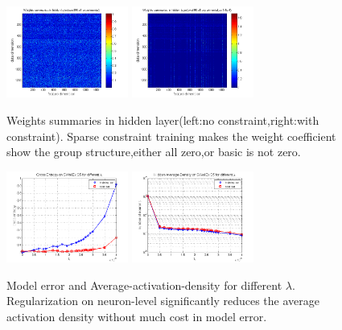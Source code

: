\begin{figure}
\includegraphics[width=4cm,height=3cm]{figure/Weights_summaries_in_hidden_laye_swell_exp}
\includegraphics[width=4cm,height=3cm]{figure/Weights_summaries_in_hidden_laye_swell_exp_sc_3dot5_e_neg_5}
\caption{Weights summaries in hidden layer(left:no constraint,right:with constraint). Sparse constraint
training makes the weight coefficient show the group structure,either all zero,or basic is not zero.}
\end{figure}

\begin{figure}
\includegraphics[width=4cm,height=3cm]{figure/Cross_Entropy_on_SWellEx_S5_for_different_lambda}
\includegraphics[width=4cm,height=3cm]{figure/Hidden_Average_Density_on_SWellEx_S5_for_different_lambda}
\caption{Model error and Average-activation-density for different $\lambda $.  Regularization on neuron-level
significantly reduces the average activation density without much cost in model error.}
\end{figure}


